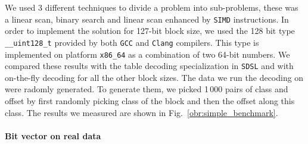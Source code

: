 We used 3 different techniques to divide a problem into sub-problems, these was a linear scan,
binary search and linear scan enhanced by \texttt{SIMD} instructions. In order to implement the
solution for 127-bit block size, we used the 128 bit type \texttt{\_\_uint128\_t} provided by both
\texttt{GCC} and \texttt{Clang} compilers. This type is implemented on platform \texttt{x86\_64}
as a combination of two 64-bit numbers. We compared these results with the table decoding specialization
in \texttt{SDSL} and with on-the-fly decoding for all the other block sizes. The data we run the decoding
on were radomly generated. To generate them, we picked 1\,000 pairs of class and offset by first randomly
picking class of the block and then the offset along this class. The results we measured are shown in
Fig.~\ref{obr:simple_benchmark}.

\paragraph{Bit vector on real data}


